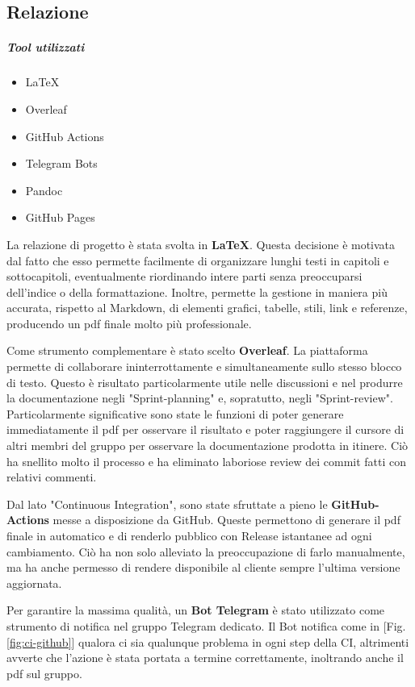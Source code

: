     \subsection{Relazione}
        \subparagraph{Tool utilizzati}
        \begin{itemize}
            \item \LaTeX
            \item Overleaf
            \item GitHub Actions
            \item Telegram Bots
            \item Pandoc
            \item GitHub Pages
        \end{itemize}
        La relazione di progetto è stata svolta in \textbf{\LaTeX}. Questa decisione è motivata dal fatto che esso permette facilmente di organizzare lunghi testi in capitoli e sottocapitoli, eventualmente riordinando intere parti senza preoccuparsi dell'indice o della formattazione. Inoltre, permette la gestione in maniera più accurata, rispetto al Markdown, di elementi grafici, tabelle, stili, link e referenze, producendo un pdf finale molto più professionale. 
        
        Come strumento complementare è stato scelto \textbf{Overleaf}. La piattaforma permette di collaborare ininterrottamente e simultaneamente sullo stesso blocco di testo. Questo è risultato particolarmente utile nelle discussioni e nel produrre la documentazione negli "Sprint-planning" e, sopratutto, negli "Sprint-review". Particolarmente significative sono state le funzioni di poter generare immediatamente il pdf per osservare il risultato e poter raggiungere il cursore di altri membri del gruppo per osservare la documentazione prodotta in itinere. Ciò ha snellito molto il processo e ha eliminato laboriose review dei commit fatti con relativi commenti.  

        Dal lato "Continuous Integration", sono state sfruttate a pieno le \textbf{GitHub-Actions} messe a disposizione da GitHub. Queste permettono di generare il pdf finale in automatico e di renderlo pubblico con Release istantanee ad ogni cambiamento. Ciò ha non solo alleviato la preoccupazione di farlo manualmente, ma ha anche permesso di rendere disponibile al cliente sempre l'ultima versione aggiornata. 

        Per garantire la massima qualità, un \textbf{Bot Telegram} è stato utilizzato come strumento di notifica nel gruppo Telegram dedicato. Il Bot notifica come in [Fig. \ref{fig:ci-github}] qualora ci sia qualunque problema in ogni step della CI, altrimenti avverte che l'azione è stata portata a termine correttamente, inoltrando anche il pdf sul gruppo. 

